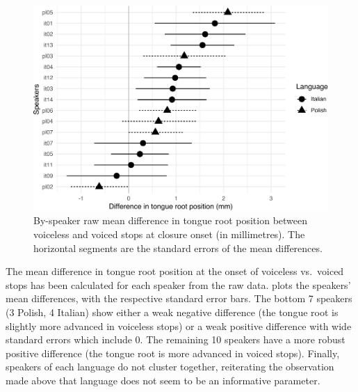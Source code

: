 \documentclass[preprint]{JASAnew}
\begin{document}
\begin{figure}
\includegraphics[width=\linewidth]{./Figure7-1} \caption{By-speaker raw mean difference in tongue root position between voiceless and voiced stops at closure onset (in millimetres). The horizontal segments are the standard errors of the mean differences.}\label{f:Figure7}
\end{figure}

The mean difference in tongue root position at the onset of voiceless
vs.~voiced stops has been calculated for each speaker from the raw data.
 plots the speakers' mean differences, with the
respective standard error bars. The bottom 7 speakers (3 Polish, 4
Italian) show either a weak negative difference (the tongue root is
slightly more advanced in voiceless stops) or a weak positive difference
with wide standard errors which include 0. The remaining 10 speakers
have a more robust positive difference (the tongue root is more advanced
in voiced stops). Finally, speakers of each language do not cluster
together, reiterating the observation made above that language does not
seem to be an informative parameter.
\end{document}
